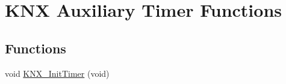 \hypertarget{group___k_n_x___aux___exported___functions___group2}{}\section{K\+NX Auxiliary Timer Functions}
\label{group___k_n_x___aux___exported___functions___group2}
\subsection*{Functions}
\begin{DoxyCompactItemize}
\item 
void \hyperlink{group___k_n_x___aux___exported___functions___group2_ga21f8fee0433331a8a98b552d934d7fa9}{K\+N\+X\+\_\+\+Init\+Timer} (void)\hypertarget{group___k_n_x___aux___exported___functions___group2_ga21f8fee0433331a8a98b552d934d7fa9}{}\label{group___k_n_x___aux___exported___functions___group2_ga21f8fee0433331a8a98b552d934d7fa9}


\end{DoxyCompactItemize}
